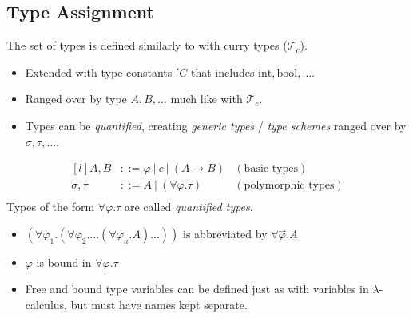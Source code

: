 \subsection{Type Assignment}
The set of types is defined similarly to with curry types ($\mathcal{T}_c$).
\begin{itemize}
    \item Extended with type constants $'C$ that includes $\text{int}, \text{bool}, \dots$.
    \item Ranged over by type $A, B, \dots$ much like with $\mathcal{T}_c$.
    \item Types can be \textit{quantified}, creating \textit{generic types} / \textit{type schemes} ranged over by $\sigma, \tau, \dots$.
\end{itemize}
\[\begin{matrix*}[l]
    A, B & ::= \varphi \ | \ c \ | \ (A \to B) & (\text{basic types}) \\
    \sigma , \tau & ::= A \ | \ (\forall \varphi . \tau) & (\text{polymorphic types}) \\
\end{matrix*}\]
Types of the form $\forall \varphi . \tau$ are called \textit{quantified types}.
\begin{itemize}
    \item $(\forall \varphi_1 . (\forall \varphi_2 . \dots (\forall \varphi_n . A)\dots))$ is abbreviated by $\forall \overset{\rightharpoonup}{\varphi} . A$
    \item $\varphi$ is bound in $\forall \varphi . \tau$
    \item Free and bound type variables can be defined just as with variables in $\lambda$-calculus, but must have names kept separate.
\end{itemize}

